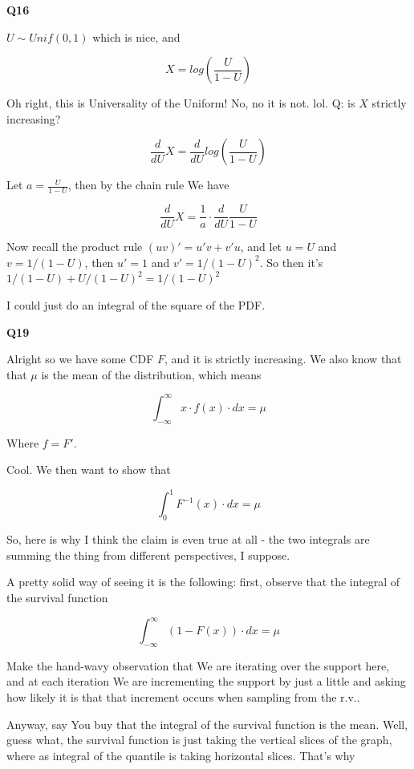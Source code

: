 \documentclass{article}
\begin{document}
			\hfill
			
		\textbf{Q16}
		
			$U\sim Unif(0, 1)$ which is nice, and 
		
			\[ X = log\left(\frac{U}{1-U} \right)\]
						
			Oh right, this is Universality of the Uniform! No, no it is not. lol. Q: is $X$ strictly increasing?
		
			\[ \frac{d}{dU} X = \frac{d}{dU} log\left(\frac{U}{1-U} \right) \]
		
			Let $a = \frac{U}{1-U} $, then by the chain rule We have 
		
			\[ \frac{d}{dU} X = \frac{1}{a} \cdot \frac{d}{dU} \frac{U}{1-U}  \]
		
			Now recall the product rule $(uv)' = u'v + v'u$, and let $u = U$ and $v = 1/(1-U)$, then $u' = 1$ and $v' = 1/(1-U)^2$. So then it's $1/(1-U) + U/(1-U)^2 = 1/(1-U)^2$

			I could just do an integral of the square of the PDF. 
	
			\hfill
			
		\textbf{Q19}
		
			Alright so we have some CDF $F$, and it is strictly increasing. We also know that that $\mu$ is the mean of the distribution, which means
			
			\[ \int^\infty_{-\infty} x\cdot f(x)\cdot  dx = \mu \]

			Where $f = F'$.
			
			Cool. We then want to show that
			
			\[ \int^1_0 F^{-1}(x) \cdot dx = \mu \]

			So, here is why I think the claim is even true at all - the two integrals are summing the thing from different perspectives, I suppose. 
			
			A pretty solid way of seeing it is the following: first, observe that the integral of the survival function 
			
			\[ \int^\infty_{-\infty} (1-F(x)) \cdot dx = \mu \]
		
			Make the hand-wavy observation that We are iterating over the support here, and at each iteration We are incrementing the support by just a little and asking how likely it is that that increment occurs when sampling from the r.v..
			
			Anyway, say You buy that the integral of the survival function is the mean. Well, guess what, the survival function is just taking the vertical slices of the graph, where as integral of the quantile is taking horizontal slices. That's why 
\end{document}
